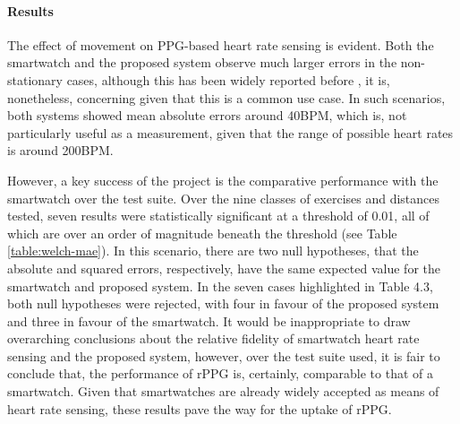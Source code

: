 \paragraph{Results}
The effect of movement on PPG-based heart rate sensing is evident. Both the smartwatch and the proposed system observe much larger errors in the non-stationary cases, although this has 
been widely reported before \cite{souza2019heart}, it is, nonetheless, concerning given that this is a common use case. In such scenarios, both systems showed mean absolute errors around 40BPM,
which is, not particularly useful as a measurement, given that the range of possible heart rates is around 200BPM.
\par
However, a key success of the project is the comparative performance with the smartwatch over the test suite. 
Over the nine classes of exercises and distances tested, seven results were statistically significant at a
threshold of 0.01, all of which are over an order of magnitude beneath the threshold (see Table \ref{table:welch-mae}). 
In this scenario, there are two null hypotheses, that the absolute and squared errors, respectively, have the same expected value for the smartwatch and proposed system. 
In the seven cases highlighted in Table 4.3, both null hypotheses were rejected, with four in favour of the proposed system and three in favour of the smartwatch.
It would be inappropriate to draw overarching conclusions about the relative fidelity of smartwatch heart rate sensing and the proposed system, however, over the test suite used, it is fair to conclude 
that, the performance of rPPG is, certainly, comparable to that of a smartwatch. Given that smartwatches are already widely accepted as means of heart rate sensing, these results pave the way for the uptake of rPPG.


